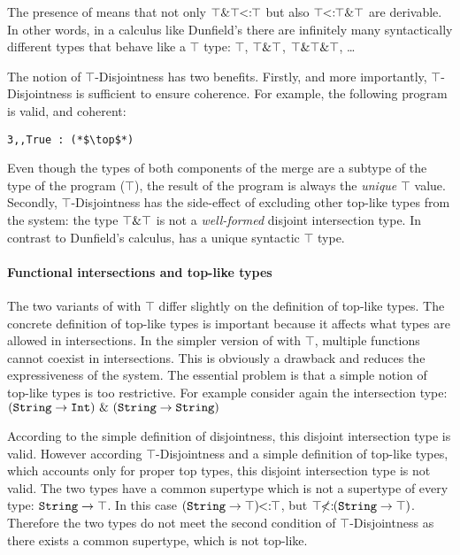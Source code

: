 \noindent The presence of   means that not only  
${\top\& \top} \!\!<:\!\! {\top}$ but also 
${\top} \!\!<:\!\! {\top \& \top}$ are derivable.
In other words, in a calculus like Dunfield's there are infinitely
many syntactically different types that behave like a $\top$ type: 
$\top$, $\top \& \top$, $\top \& \top \& \top$, \ldots

The notion of $\top$-Disjointness has two benefits. Firstly, and more
importantly, $\top$-Disjointness is sufficient to ensure
coherence. For example, the following program is valid, and coherent:

\begin{lstlisting}
3,,True : (*$\top$*) 
\end{lstlisting}

\noindent Even though the types of both components of the merge are a
subtype of the type of the program ($\top$), the result of the
program is always the \emph{unique} $\top$ value. Secondly,
$\top$-Disjointness has the side-effect of excluding other top-like
types from the system: the type $\top \& \top$ is not
a \emph{well-formed} disjoint intersection type. In contrast to Dunfield's
calculus, \name has a unique syntactic $\top$ type.

\paragraph{Functional intersections and top-like types}
The two variants of \name with $\top$ differ slightly on the
definition of top-like types. The concrete definition of top-like 
types is important because it affects what types are allowed in intersections.
In the simpler version of \name with $\top$, multiple
functions cannot coexist in intersections. This is obviously a drawback and 
reduces the expressiveness of the system. The essential
problem is that a simple notion of top-like types is too restrictive. 
For example consider again the intersection type: \\

$(\texttt{String} \to \texttt{Int})~\&~(\texttt{String} \to  \texttt{String})$
\vspace{5pt}

\noindent According to the simple definition of disjointness, this disjoint
intersection type is valid. However according $\top$-Disjointness and a simple definition
of top-like types, which accounts only for proper top types, this disjoint intersection type is not valid. 
The two types have a common supertype which is not a supertype of
every type: $\texttt{String} \to \top$. In this case $(\texttt{String} \to
\top)\!\!<:\!\!\top$, but $\top\!\!\not<:\!\!(\texttt{String} \to
\top)$. Therefore the two types do not meet the second condition of
$\top$-Disjointness as there exists a common supertype, which is not top-like.

